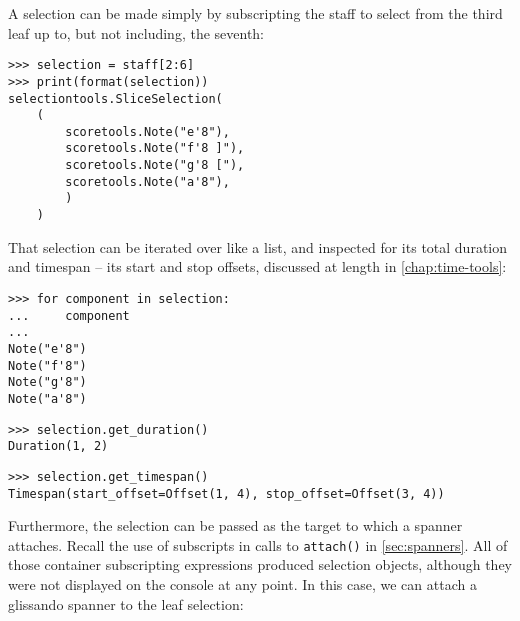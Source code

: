 \noindent A selection can be made simply by subscripting the staff to select
from the third leaf up to, but not including, the seventh:

\begin{comment}
<abjad>
selection = staff[2:6]
print(format(selection))
</abjad>
\end{comment}

\begin{abjadbookoutput}
\begin{singlespacing}
\vspace{-0.5\baselineskip}
\begin{verbatim}
>>> selection = staff[2:6]
>>> print(format(selection))
selectiontools.SliceSelection(
    (
        scoretools.Note("e'8"),
        scoretools.Note("f'8 ]"),
        scoretools.Note("g'8 ["),
        scoretools.Note("a'8"),
        )
    )
\end{verbatim}
\end{singlespacing}
\end{abjadbookoutput}

\noindent That selection can be iterated over like a list, and inspected for
its total duration and timespan -- its start and stop offsets, discussed at
length in \autoref{chap:time-tools}:

\begin{comment}
<abjad>
for component in selection:
    component

selection.get_duration()
selection.get_timespan()
</abjad>
\end{comment}

\begin{abjadbookoutput}
\begin{singlespacing}
\vspace{-0.5\baselineskip}
\begin{verbatim}
>>> for component in selection:
...     component
...
Note("e'8")
Note("f'8")
Note("g'8")
Note("a'8")
\end{verbatim}
\begin{verbatim}
>>> selection.get_duration()
Duration(1, 2)
\end{verbatim}
\begin{verbatim}
>>> selection.get_timespan()
Timespan(start_offset=Offset(1, 4), stop_offset=Offset(3, 4))
\end{verbatim}
\end{singlespacing}
\end{abjadbookoutput}

\noindent Furthermore, the selection can be passed as the target to which a
spanner attaches. Recall the use of subscripts in calls to \texttt{attach()} in
\autoref{sec:spanners}. All of those container subscripting expressions
produced selection objects, although they were not displayed on the console at
any point. In this case, we can attach a glissando spanner to the leaf
selection:

